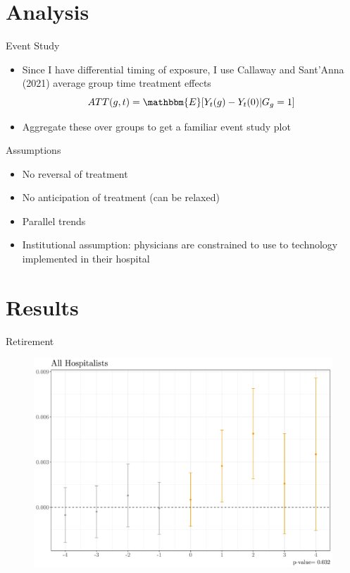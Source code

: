 \documentclass[10pt]{beamer}
\begin{document}
\section{Analysis}


\begin{frame}{Event Study}

\begin{itemize}
    \item Since I have differential timing of exposure, I use Callaway and Sant'Anna (2021) average group time treatment effects
    \vspace{3mm}
    $$ATT(g,t)=\mathbbm{E}[Y_t(g)-Y_t(0)|G_g=1]$$
    \vspace{3mm}
    \item Aggregate these over groups to get a familiar event study plot
\end{itemize}
    
\end{frame}

\begin{frame}{Assumptions}
\begin{itemize}
    \item No reversal of treatment
    \item No anticipation of treatment (can be relaxed)
    \item Parallel trends
    \item Institutional assumption: physicians are constrained to use to technology implemented in their hospital
\end{itemize}
    
\end{frame}

\section{Results}


\begin{frame}{Retirement}
\begin{figure}[ht]
    \centering
    \includegraphics[scale=.4]{Objects/Presentation_retire_all.pdf}
\end{figure}
\end{frame}
\end{document}
